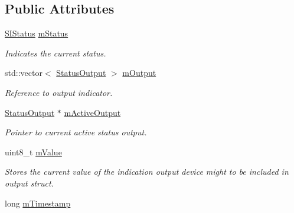 \subsection*{Public Attributes}
\begin{DoxyCompactItemize}
\item 
\hyperlink{classSPMB_1_1StatusIndicator_a6d5ae5d45a9147ec76bd72da143fb4de}{S\+I\+Status} \hyperlink{classSPMB_1_1StatusIndicator_a66a8ca80e4744a85b3e9fe82cd17eab0}{m\+Status}\hypertarget{classSPMB_1_1StatusIndicator_a66a8ca80e4744a85b3e9fe82cd17eab0}{}\label{classSPMB_1_1StatusIndicator_a66a8ca80e4744a85b3e9fe82cd17eab0}

\begin{DoxyCompactList}\small\item\em Indicates the current status. \end{DoxyCompactList}\item 
std\+::vector$<$ \hyperlink{structSPMB_1_1StatusIndicator_1_1StatusOutput}{Status\+Output} $>$ \hyperlink{classSPMB_1_1StatusIndicator_a75ad3ac60f256cfc30628f127ee3c912}{m\+Output}\hypertarget{classSPMB_1_1StatusIndicator_a75ad3ac60f256cfc30628f127ee3c912}{}\label{classSPMB_1_1StatusIndicator_a75ad3ac60f256cfc30628f127ee3c912}

\begin{DoxyCompactList}\small\item\em Reference to output indicator. \end{DoxyCompactList}\item 
\hyperlink{structSPMB_1_1StatusIndicator_1_1StatusOutput}{Status\+Output} $\ast$ \hyperlink{classSPMB_1_1StatusIndicator_a67002509cc1601da177d99224650ab70}{m\+Active\+Output}\hypertarget{classSPMB_1_1StatusIndicator_a67002509cc1601da177d99224650ab70}{}\label{classSPMB_1_1StatusIndicator_a67002509cc1601da177d99224650ab70}

\begin{DoxyCompactList}\small\item\em Pointer to current active status output. \end{DoxyCompactList}\item 
uint8\+\_\+t \hyperlink{classSPMB_1_1StatusIndicator_aae255bc53c256d49785d469cdff463c1}{m\+Value}\hypertarget{classSPMB_1_1StatusIndicator_aae255bc53c256d49785d469cdff463c1}{}\label{classSPMB_1_1StatusIndicator_aae255bc53c256d49785d469cdff463c1}

\begin{DoxyCompactList}\small\item\em Stores the current value of the indication output device  might to be included in output struct. \end{DoxyCompactList}\item 
long \hyperlink{classSPMB_1_1StatusIndicator_aa9dd16e77150efc043b42db209adb4e4}{m\+Timestamp}\hypertarget{classSPMB_1_1StatusIndicator_aa9dd16e77150efc043b42db209adb4e4}{}\label{classSPMB_1_1StatusIndicator_aa9dd16e77150efc043b42db209adb4e4}


\end{DoxyCompactItemize}
